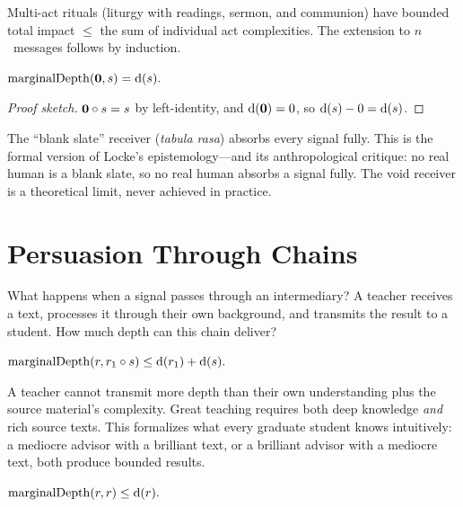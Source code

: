 Multi-act rituals (liturgy with readings, sermon, and communion) have bounded
total impact $\le$ the sum of individual act complexities.  The extension to
$n$~messages follows by induction.

\begin{theorem}
\label{thm:marginal-void-receiver}
$\mathrm{marginalDepth}(\mathbf{0}, s) = \operatorname{d}(s).$
\end{theorem}

\begin{proof}[Proof sketch]
$\mathbf{0}\circ s = s$ by left-identity, and $\operatorname{d}(\mathbf{0})=0$, so
$\operatorname{d}(s) - 0 = \operatorname{d}(s)$.
\end{proof}

The ``blank slate'' receiver (\emph{tabula rasa}) absorbs every signal
fully.  This is the formal version of Locke's epistemology---and its
anthropological critique: no real human is a blank slate, so no real human
absorbs a signal fully.  The void receiver is a theoretical limit, never
achieved in practice.


\section{Persuasion Through Chains}
\label{sec:pers-chains}

What happens when a signal passes through an intermediary?  A teacher
receives a text, processes it through their own background, and transmits
the result to a student.  How much depth can this chain deliver?

\begin{theorem}
\label{thm:chain-persuasion}
$\mathrm{marginalDepth}(r, r_1\circ s) \le \operatorname{d}(r_1) + \operatorname{d}(s).$
\end{theorem}

A teacher cannot transmit more depth than their own understanding plus the
source material's complexity.  Great teaching requires both deep knowledge
\emph{and} rich source texts.  This formalizes what every graduate student
knows intuitively: a mediocre advisor with a brilliant text, or a brilliant
advisor with a mediocre text, both produce bounded results.

\begin{theorem}
\label{thm:marginal-self}
$\mathrm{marginalDepth}(r, r) \le \operatorname{d}(r).$
\end{theorem}

